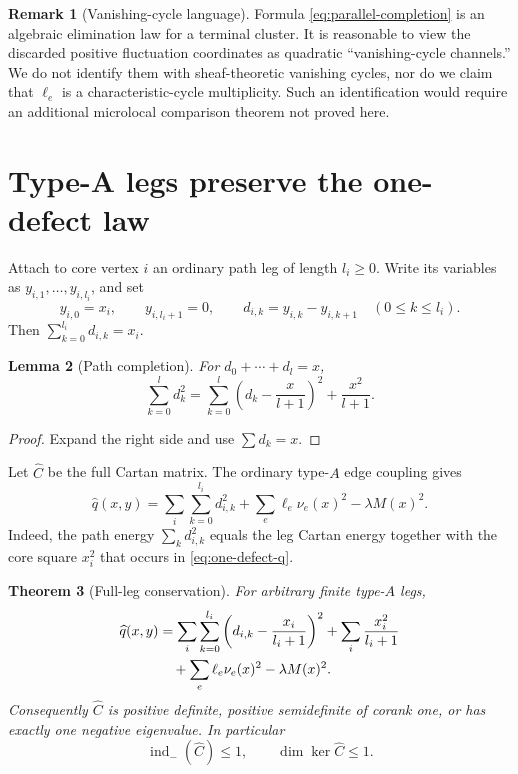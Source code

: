 \documentclass[11pt,a4paper]{amsart}
\theoremstyle{plain}
\newtheorem{theorem}{Theorem}[section]
\newtheorem{lemma}[theorem]{Lemma}
\theoremstyle{definition}
\newtheorem{remark}[theorem]{Remark}
\newcommand{\indm}{\operatorname{ind}_{-}}
\begin{document}
\begin{remark}[Vanishing-cycle language]
Formula \eqref{eq:parallel-completion} is an algebraic elimination law for a terminal cluster.  It
is reasonable to view the discarded positive fluctuation coordinates as quadratic
``vanishing-cycle channels.''  We do not identify them with sheaf-theoretic vanishing cycles, nor
do we claim that $\ell_e$ is a characteristic-cycle multiplicity.  Such an identification would
require an additional microlocal comparison theorem not proved here.
\end{remark}

\section{Type-A legs preserve the one-defect law}\label{sec:legs}

Attach to core vertex $i$ an ordinary path leg of length $l_i\ge0$.  Write its variables as
$y_{i,1},\dots,y_{i,l_i}$, and set
\[
 y_{i,0}=x_i,\qquad y_{i,l_i+1}=0,\qquad
 d_{i,k}=y_{i,k}-y_{i,k+1}\quad(0\le k\le l_i).
\]
Then $\sum_{k=0}^{l_i}d_{i,k}=x_i$.

\begin{lemma}[Path completion]\label{lem:path-completion}
For $d_0+\cdots+d_l=x$,
\begin{equation}\label{eq:path-completion}
 \sum_{k=0}^l d_k^2
 =\sum_{k=0}^l\left(d_k-\frac{x}{l+1}\right)^2+\frac{x^2}{l+1}.
\end{equation}
\end{lemma}

\begin{proof}
Expand the right side and use $\sum d_k=x$.
\end{proof}

Let $\widehat C$ be the full Cartan matrix.  The ordinary type-$A$ edge coupling gives
\begin{equation}\label{eq:full-before-completion}
 \widehat q(x,y)=
 \sum_i\sum_{k=0}^{l_i}d_{i,k}^2
 +\sum_e\ell_e\nu_e(x)^2-\lambda M(x)^2.
\end{equation}
Indeed, the path energy $\sum_kd_{i,k}^2$ equals the leg Cartan energy together with the core
square $x_i^2$ that occurs in \eqref{eq:one-defect-q}.

\begin{theorem}[Full-leg conservation]\label{thm:full-leg}
For arbitrary finite type-$A$ legs,
\begin{align}\label{eq:full-completed}
 \widehat q(x,y)
 &=\sum_i\sum_{k=0}^{l_i}
     \left(d_{i,k}-\frac{x_i}{l_i+1}\right)^2
   +\sum_i\frac{x_i^2}{l_i+1}\notag\\
 &\quad+\sum_e\ell_e\nu_e(x)^2-\lambda M(x)^2.
\end{align}
Consequently $\widehat C$ is positive definite, positive semidefinite of corank one, or has
exactly one negative eigenvalue.  In particular
\begin{equation}\label{eq:full-index}
                 \indm(\widehat C)\le1,\qquad
                 \dim\ker\widehat C\le1.
\end{equation}
\end{theorem}
\end{document}
